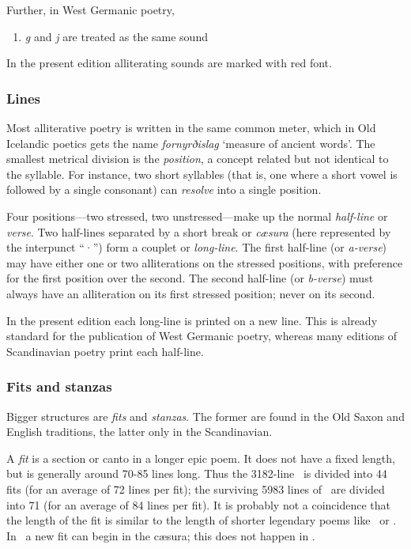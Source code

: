     Further, in West Germanic poetry,

    \begin{enumerate}[3]
      \item \emph{g} and \emph{j} are treated as the same sound
    \end{enumerate}

    In the present edition alliterating sounds are marked with red font.

    \subsubsection{Lines}
    Most alliterative poetry is written in the same common meter, which in Old Icelandic poetics gets the name \emph{fornyrðislag} ‘measure of ancient words’.  The smallest metrical division is the \emph{position}, a concept related but not identical to the syllable.  For instance, two short syllables (that is, one where a short vowel is followed by a single consonant) can \emph{resolve} into a single position.

    Four positions—two stressed, two unstressed—make up the normal \emph{half-line} or \emph{verse}.  Two half-lines separated by a short break or \emph{cæsura} (here represented by the interpunct “·”) form a couplet or \emph{long-line}.  The first half-line (or \emph{a-verse}) may have either one or two alliterations on the stressed positions, with preference for the first position over the second.  The second half-line (or \emph{b-verse}) must always have an alliteration on its first stressed position; never on its second.

    In the present edition each long-line is printed on a new line.  This is already standard for the publication of West Germanic poetry, whereas many editions of Scandinavian poetry print each half-line.

    \subsubsection{Fits and stanzas}
    Bigger structures are \emph{fits} and \emph{stanzas}.  The former are found in the Old Saxon and English traditions, the latter only in the Scandinavian.

    A \emph{fit} is a section or canto in a longer epic poem.  It does not have a fixed length, but is generally around 70-85 lines long.  Thus the 3182-line \Beowulf\ is divided into 44 fits (for an average of 72 lines per fit); the surviving 5983 lines of \Heliand\ are divided into 71 (for an average of 84 lines per fit).  It is probably not a coincidence that the length of the fit is similar to the length of shorter legendary poems like \GudrunOne\ or \Hildebrandslied.  In \Heliand\ a new fit can begin in the cæsura; this does not happen in \Beowulf.


